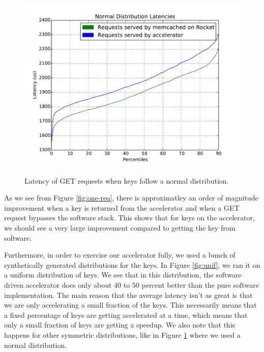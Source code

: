 \begin{figure}[t]
\begin{center}
\label{fig:norm}
\includegraphics[width=\linewidth]{norm.pdf}
\caption{Latency of GET requests when keys follow a normal distribution.}
\end{center}
\end{figure}

As we see from Figure \ref{fig:one-req}, there is approximatley an order of magnitude
improvement when a key is returned from the accelerator and when a GET request
bypasses the software stack. This shows that for keys on the accelerator, we
should see a very large improvement compared to getting the key from software.

Furthermore, in order to exercise our accelerator fully, we used a bunch of
synthetically generated distributions for the keys. In Figure \ref{fig:unif},
we ran it on a uniform distribution of keys. We see that in this distribution,
the software driven accelerator does only about $40$ to $50$ percent better
than the pure software implementation. The main reason that the average latency
isn't as great is that we are only accelerating a small fraction of the keys.
This necessarily means that a fixed percentage of keys are getting accelerated
at a time, which means that only a small fraction of keys are getting a
speedup. We also note that this happens for other symmetric distributions, like
in Figure \ref{fig:norm} where we used a normal distribution.


